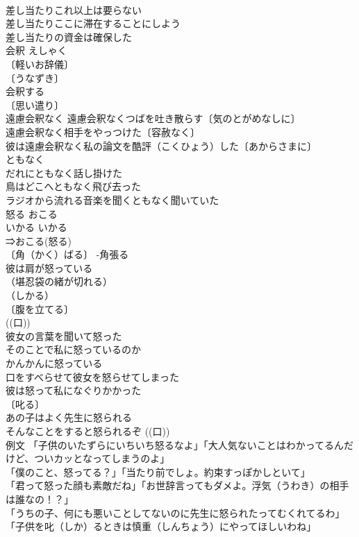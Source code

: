 \documentclass[8pt]{extreport}
\begin{document}
\begin{CJK}{UTF8}{min}
\\	差し当たりこれ以上は要らない 
\\	差し当たりここに滞在することにしよう 
\\	差し当たりの資金は確保した 
\\	会釈	えしゃく	
\\	〔軽いお辞儀〕
\\	〔うなずき〕
\\	会釈する 
\\	〔思い遣り〕　
\\	遠慮会釈なく 遠慮会釈なくつばを吐き散らす〔気のとがめなしに〕 
\\	遠慮会釈なく相手をやっつけた〔容赦なく〕 
\\	彼は遠慮会釈なく私の論文を酷評（こくひょう）した〔あからさまに〕 
\\	ともなく		
\\	だれにともなく話し掛けた 
\\	鳥はどこへともなく飛び去った 
\\	ラジオから流れる音楽を聞くともなく聞いていた 
\\	怒る	おこる 
\\	いかる	いかる 
\\	⇒おこる(怒る) 
\\	〔角（かく）ばる〕 -角張る　
\\	彼は肩が怒っている 
\\	（堪忍袋の緒が切れる）
\\	（しかる）
\\	〔腹を立てる〕
\\	((口)) 
\\	彼女の言葉を聞いて怒った 
\\	そのことで私に怒っているのか 
\\	かんかんに怒っている 
\\	口をすべらせて彼女を怒らせてしまった 
\\	彼は怒って私になぐりかかった 
\\	〔叱る〕
\\	あの子はよく先生に怒られる 
\\	そんなことをすると怒られるぞ ((口)) 
\\	例文 「子供のいたずらにいちいち怒るなよ」「大人気ないことはわかってるんだけど、ついカッとなってしまうのよ」 
\\	「僕のこと、怒ってる？」「当たり前でしょ。約束すっぽかしといて」 
\\	「君って怒った顔も素敵だね」「お世辞言ってもダメよ。浮気（うわき）の相手は誰なの！？」 
\\	「うちの子、何にも悪いことしてないのに先生に怒られたってむくれてるわ」「子供を叱（しか）るときは慎重（しんちょう）にやってほしいわね」 

\end{CJK}
\end{document}
